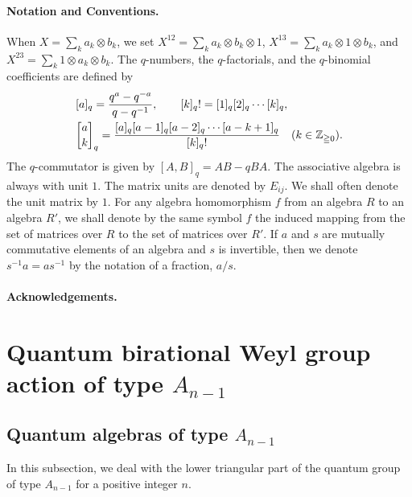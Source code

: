 \documentclass[12pt,twoside]{article}
\newcommand\ot{\otimes}
\newcommand\Z{{\mathbb Z}} %
\theoremstyle{plain} %
\theoremstyle{definition} %
\theoremstyle{definition} %
\numberwithin{theorem}{section}
\numberwithin{equation}{section}
\numberwithin{figure}{section}
\numberwithin{table}{section}
\begin{document}
\paragraph{Notation and Conventions.}
When $X = \sum_k a_k\ot b_k$, we set 
$X^{12}=\sum_k a_k\ot b_k\ot 1$, 
$X^{13}=\sum_k a_k\ot 1\ot b_k$, and
$X^{23}=\sum_k 1\ot a_k\ot b_k$.
The $q$-numbers, the $q$-factorials, and the $q$-binomial coefficients are defined by
\begin{align*}
 &
 [a]_q = \frac{q^a-q^{-a}}{q-q^{-1}}, \qquad
 [k]_q! = [1]_q[2]_q\cdots[k]_q, \quad
 \\ &
 \qbinom{a}{k}_q =
 \frac{[a]_q[a-1]_q[a-2]_q\cdots[a-k+1]_q}{[k]_q!}
 \quad  (k\in\Z_{\geqq0}).
\end{align*}
The $q$-commutator is given by $[A,B]_q=AB-qBA$.
The associative algebra is always with unit $1$. 
The matrix units are denoted by $E_{ij}$.
We shall often denote the unit matrix by $1$.
For any algebra homomorphism $f$ from an algebra $R$ to an algebra $R'$,
we shall denote by the same symbol $f$
the induced mapping from the set of matrices over $R$
to the set of matrices over $R'$.
If $a$ and $s$ are mutually commutative elements of an algebra 
and $s$ is invertible, then we denote $s^{-1}a=as^{-1}$ 
by the notation of a fraction, $a/s$.


\paragraph{Acknowledgements.}
\ACKNOWLEDGEMENTS


\section{Quantum birational Weyl group action of type $A_{n-1}$}
\label{sec:A_{n-1}}


\subsection{Quantum algebras of type $A_{n-1}$}
\label{sec:quantum-alg-A_{n-1}}

In this subsection, we deal with the lower triangular part of 
the quantum group of type $A_{n-1}$ for a positive integer $n$.
\end{document}
